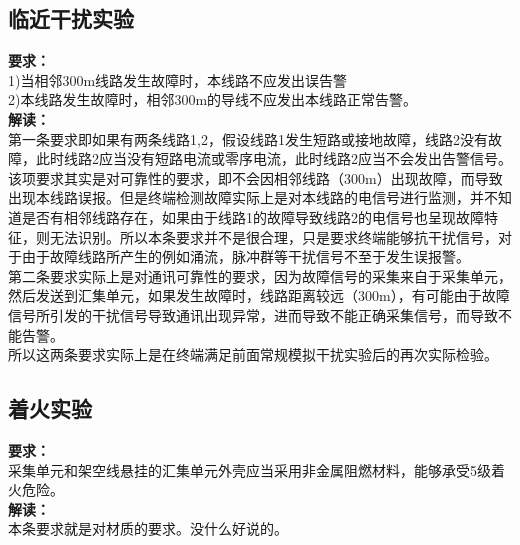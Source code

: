 \documentclass{article}
\begin{document}
\begin{CJK}{UTF8}{gbsn}
\subsection{ 临近干扰实验	}
	\par
	\textbf{要求：}\\
	1)当相邻300m线路发生故障时，本线路不应发出误告警\\
	2)本线路发生故障时，相邻300m的导线不应发出本线路正常告警。\\
	\textbf{解读：}\\
	第一条要求即如果有两条线路1,2，假设线路1发生短路或接地故障，线路2没有故障，此时线路2应当没有短路电流或零序电流，此时线路2应当不会发出告警信号。该项要求其实是对可靠性的要求，即不会因相邻线路（300m）出现故障，而导致出现本线路误报。但是终端检测故障实际上是对本线路的电信号进行监测，并不知道是否有相邻线路存在，如果由于线路1的故障导致线路2的电信号也呈现故障特征，则无法识别。所以本条要求并不是很合理，只是要求终端能够抗干扰信号，对于由于故障线路所产生的例如涌流，脉冲群等干扰信号不至于发生误报警。\\
	第二条要求实际上是对通讯可靠性的要求，因为故障信号的采集来自于采集单元，然后发送到汇集单元，如果发生故障时，线路距离较远（300m），有可能由于故障信号所引发的干扰信号导致通讯出现异常，进而导致不能正确采集信号，而导致不能告警。
\\
所以这两条要求实际上是在终端满足前面常规模拟干扰实验后的再次实际检验。
\subsection{ 着火实验}
	\par
	\textbf{要求：}\\
	采集单元和架空线悬挂的汇集单元外壳应当采用非金属阻燃材料，能够承受5级着火危险。\\
	\textbf{解读：}\\
	本条要求就是对材质的要求。没什么好说的。

\end{CJK}
\end{document}
